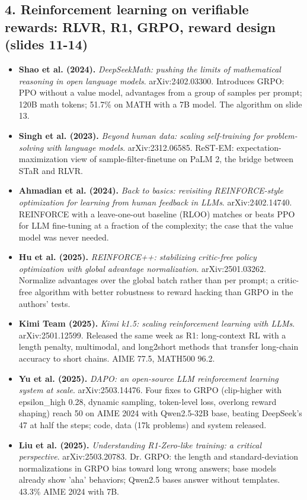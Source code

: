 \documentclass[11pt,letterpaper]{article}
\begin{document}
\subsection*{4. Reinforcement learning on verifiable rewards: RLVR, R1, GRPO, reward design (slides 11-14)}
\begin{itemize}[leftmargin=1.2em,itemsep=3pt]\sloppy
\item \textbf{Shao et al. (2024).} \textit{DeepSeekMath: pushing the limits of mathematical reasoning in open language models}. arXiv:2402.03300. Introduces GRPO: PPO without a value model, advantages from a group of samples per prompt; 120B math tokens; 51.7\% on MATH with a 7B model. The algorithm on slide 13.
\item \textbf{Singh et al. (2023).} \textit{Beyond human data: scaling self-training for problem-solving with language models}. arXiv:2312.06585. ReST-EM: expectation-maximization view of sample-filter-finetune on PaLM 2, the bridge between STaR and RLVR.
\item \textbf{Ahmadian et al. (2024).} \textit{Back to basics: revisiting REINFORCE-style optimization for learning from human feedback in LLMs}. arXiv:2402.14740. REINFORCE with a leave-one-out baseline (RLOO) matches or beats PPO for LLM fine-tuning at a fraction of the complexity; the case that the value model was never needed.
\item \textbf{Hu et al. (2025).} \textit{REINFORCE++: stabilizing critic-free policy optimization with global advantage normalization}. arXiv:2501.03262. Normalize advantages over the global batch rather than per prompt; a critic-free algorithm with better robustness to reward hacking than GRPO in the authors' tests.
\item \textbf{Kimi Team (2025).} \textit{Kimi k1.5: scaling reinforcement learning with LLMs}. arXiv:2501.12599. Released the same week as R1: long-context RL with a length penalty, multimodal, and long2short methods that transfer long-chain accuracy to short chains. AIME 77.5, MATH500 96.2.
\item \textbf{Yu et al. (2025).} \textit{DAPO: an open-source LLM reinforcement learning system at scale}. arXiv:2503.14476. Four fixes to GRPO (clip-higher with epsilon\_high 0.28, dynamic sampling, token-level loss, overlong reward shaping) reach 50 on AIME 2024 with Qwen2.5-32B base, beating DeepSeek's 47 at half the steps; code, data (17k problems) and system released.
\item \textbf{Liu et al. (2025).} \textit{Understanding R1-Zero-like training: a critical perspective}. arXiv:2503.20783. Dr. GRPO: the length and standard-deviation normalizations in GRPO bias toward long wrong answers; base models already show 'aha' behaviors; Qwen2.5 bases answer without templates. 43.3\% AIME 2024 with 7B.

\end{itemize}
\end{document}
